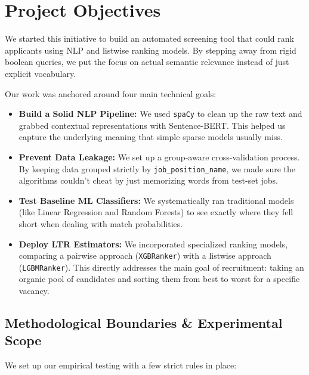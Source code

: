 \documentclass[12pt,a4paper,oneside]{report}
\begin{document}
\chapter{Project Objectives}

We started this initiative to build an automated screening tool that could rank applicants using NLP and listwise ranking models. By stepping away from rigid boolean queries, we put the focus on actual semantic relevance instead of just explicit vocabulary.

Our work was anchored around four main technical goals:

\begin{itemize}
    \item \textbf{Build a Solid NLP Pipeline:} We used \texttt{spaCy} to clean up the raw text and grabbed contextual representations with Sentence-BERT. This helped us capture the underlying meaning that simple sparse models usually miss.
    
    \item \textbf{Prevent Data Leakage:} We set up a group-aware cross-validation process. By keeping data grouped strictly by \texttt{job\_position\_name}, we made sure the algorithms couldn't cheat by just memorizing words from test-set jobs.
    
    \item \textbf{Test Baseline ML Classifiers:} We systematically ran traditional models (like Linear Regression and Random Forests) to see exactly where they fell short when dealing with match probabilities.
    
    \item \textbf{Deploy LTR Estimators:} We incorporated specialized ranking models, comparing a pairwise approach (\texttt{XGBRanker}) with a listwise approach (\texttt{LGBMRanker}). This directly addresses the main goal of recruitment: taking an organic pool of candidates and sorting them from best to worst for a specific vacancy.
\end{itemize}

\newpage
\vspace{0.5em}
\section*{Methodological Boundaries \& Experimental Scope}

We set up our empirical testing with a few strict rules in place:
\end{document}
